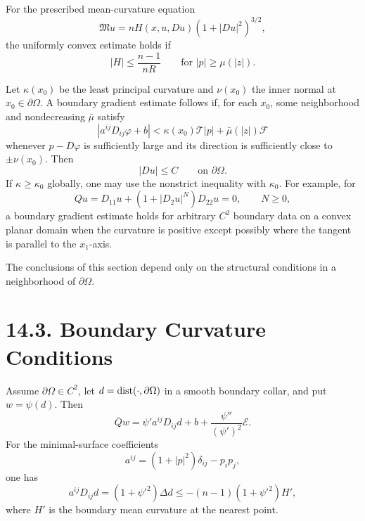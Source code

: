 For the prescribed mean-curvature equation
\begin{equation}
\mathfrak Mu=nH(x,u,Du)(1+|Du|^2)^{3/2},
\tag{14.35}
\end{equation}
the uniformly convex estimate holds if
\begin{equation}
|H|\leq\frac{n-1}{nR}
\qquad\text{for }|p|\geq\mu(|z|).
\tag{14.36}
\end{equation}

\begin{remark}
\label{gt14-boundary-gradient-14-r1}
Let $\kappa(x_0)$ be the least principal curvature and $\nu(x_0)$ the inner
normal at $x_0\in\partial\Omega$. A boundary gradient estimate follows if, for
each $x_0$, some neighborhood and nondecreasing $\bar\mu$ satisfy
\begin{equation}
|a^{ij}D_{ij}\varphi+b|
<\kappa(x_0)\mathcal T|p|+\bar\mu(|z|)\mathcal F
\tag{14.37}
\end{equation}
whenever $p-D\varphi$ is sufficiently large and its direction is sufficiently
close to $\pm\nu(x_0)$. Then
\begin{equation}
|Du|\leq C\qquad\text{on }\partial\Omega.
\tag{14.38}
\end{equation}
If $\kappa\geq\kappa_0$ globally, one may use the nonstrict inequality with
$\kappa_0$. For example, for
\begin{equation}
Qu=D_{11}u+(1+|D_2u|^N)D_{22}u=0,\qquad N\geq0,
\tag{14.39}
\end{equation}
a boundary gradient estimate holds for arbitrary $C^2$ boundary data on a
convex planar domain when the curvature is positive except possibly where the
tangent is parallel to the $x_1$-axis.
\end{remark}

The conclusions of this section depend only on the structural conditions in a
neighborhood of $\partial\Omega$.

\section*{14.3. Boundary Curvature Conditions}

Assume $\partial\Omega\in C^2$, let $d=\operatorname{dist}(\cdot,\partial\Omega)$ in a smooth
boundary collar, and put $w=\psi(d)$. Then
\begin{equation}
\overline Qw
=\psi'a^{ij}D_{ij}d+b+\frac{\psi''}{(\psi')^2}\mathcal E.
\tag{14.40}
\end{equation}
For the minimal-surface coefficients
\begin{equation}
a^{ij}=(1+|p|^2)\delta_{ij}-p_ip_j,
\tag{14.41}
\end{equation}
one has
\begin{equation}
a^{ij}D_{ij}d=(1+\psi'^2)\Delta d
\leq-(n-1)(1+\psi'^2)H',
\tag{14.42}
\end{equation}
where $H'$ is the boundary mean curvature at the nearest point.

